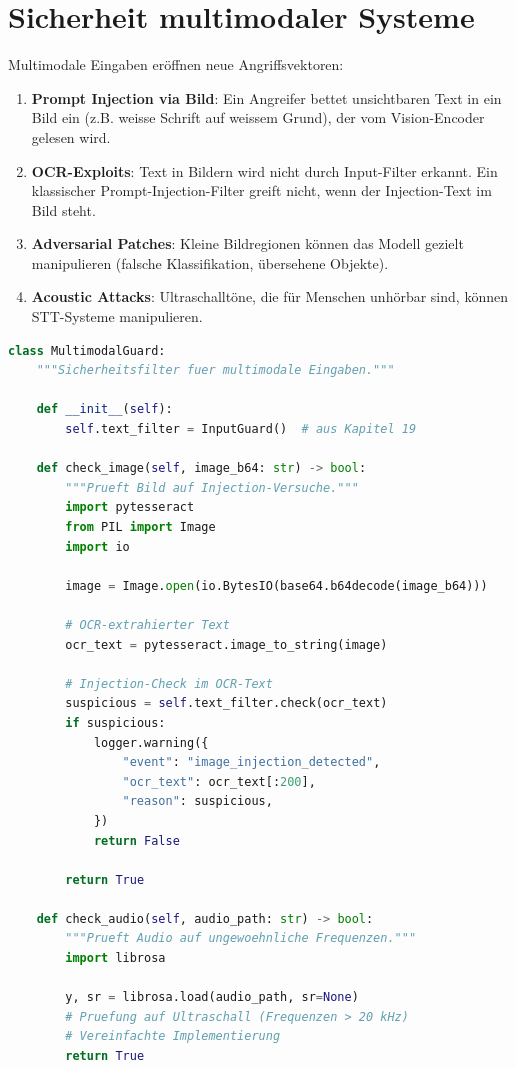 \section{Sicherheit multimodaler Systeme}

Multimodale Eingaben eröffnen neue Angriffsvektoren:

\begin{enumerate}[leftmargin=*]
    \item \textbf{Prompt Injection via Bild}: Ein Angreifer bettet unsichtbaren Text in ein Bild ein (z.B. weisse Schrift auf weissem Grund), der vom Vision-Encoder gelesen wird.
    \item \textbf{OCR-Exploits}: Text in Bildern wird nicht durch Input-Filter erkannt. Ein klassischer Prompt-Injection-Filter greift nicht, wenn der Injection-Text im Bild steht.
    \item \textbf{Adversarial Patches}: Kleine Bildregionen können das Modell gezielt manipulieren (falsche Klassifikation, übersehene Objekte).
    \item \textbf{Acoustic Attacks}: Ultraschalltöne, die für Menschen unhörbar sind, können STT-Systeme manipulieren.
\end{enumerate}

\begin{lstlisting}[language=Python, caption=Multimodaler Input-Guard]
class MultimodalGuard:
    """Sicherheitsfilter fuer multimodale Eingaben."""

    def __init__(self):
        self.text_filter = InputGuard()  # aus Kapitel 19

    def check_image(self, image_b64: str) -> bool:
        """Prueft Bild auf Injection-Versuche."""
        import pytesseract
        from PIL import Image
        import io

        image = Image.open(io.BytesIO(base64.b64decode(image_b64)))

        # OCR-extrahierter Text
        ocr_text = pytesseract.image_to_string(image)

        # Injection-Check im OCR-Text
        suspicious = self.text_filter.check(ocr_text)
        if suspicious:
            logger.warning({
                "event": "image_injection_detected",
                "ocr_text": ocr_text[:200],
                "reason": suspicious,
            })
            return False

        return True

    def check_audio(self, audio_path: str) -> bool:
        """Prueft Audio auf ungewoehnliche Frequenzen."""
        import librosa

        y, sr = librosa.load(audio_path, sr=None)
        # Pruefung auf Ultraschall (Frequenzen > 20 kHz)
        # Vereinfachte Implementierung
        return True
\end{lstlisting}

